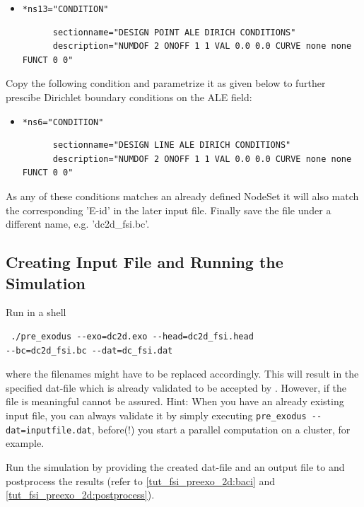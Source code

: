 \begin{itemize}
  \item \verb|*ns13="CONDITION"| \qquad
  \begin{small} \begin{verbatim}
      sectionname="DESIGN POINT ALE DIRICH CONDITIONS"
      description="NUMDOF 2 ONOFF 1 1 VAL 0.0 0.0 CURVE none none FUNCT 0 0"
    \end{verbatim}
   \end{small}
\end{itemize}
   
Copy the following condition and parametrize it as given below to further
prescibe Dirichlet boundary conditions on the ALE field:
   
\begin{itemize}
  \item \verb|*ns6="CONDITION"| \qquad
  \begin{small} \begin{verbatim}
      sectionname="DESIGN LINE ALE DIRICH CONDITIONS"
      description="NUMDOF 2 ONOFF 1 1 VAL 0.0 0.0 CURVE none none FUNCT 0 0"
    \end{verbatim}
   \end{small}
\end{itemize}   

As any of these conditions matches an already defined NodeSet it will also match
the corresponding 'E-id' in the later \baci{} input file.
Finally save the file under a different name, e.g. 'dc2d\_fsi.bc'.

\subsection{Creating \baci{} Input File and Running the Simulation}
Run in a shell \begin{verbatim} ./pre_exodus --exo=dc2d.exo --head=dc2d_fsi.head
--bc=dc2d_fsi.bc --dat=dc_fsi.dat\end{verbatim} where the filenames might have
to be replaced accordingly. This will result in the specified dat-file which is already validated to be accepted by \baci{}. However, if the file is meaningful cannot be assured. Hint: When you have an already existing input file, you can
always validate it by simply executing \verb|pre_exodus --dat=inputfile.dat|,
before(!) you start a parallel \baci{} computation on a cluster, for example. \newline

Run the simulation by providing the created dat-file and an output file to
\baci{} and postprocess the results (refer to \ref{tut_fsi_preexo_2d:baci} and
\ref{tut_fsi_preexo_2d:postprocess}).


